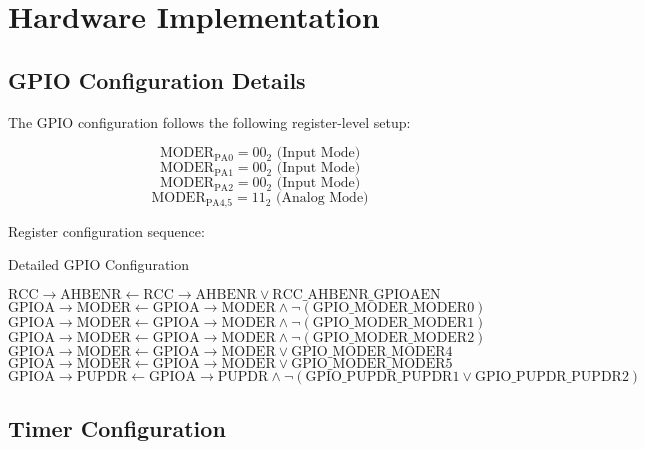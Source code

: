 \documentclass{article}
\begin{document}
\section{Hardware Implementation}
\subsection{GPIO Configuration Details}

The GPIO configuration follows the following register-level setup:

\begin{equation}
\text{MODER}_{\text{PA0}} = 00_2 \text{ (Input Mode)}
\end{equation}
\begin{equation}
\text{MODER}_{\text{PA1}} = 00_2 \text{ (Input Mode)}
\end{equation}
\begin{equation}
\text{MODER}_{\text{PA2}} = 00_2 \text{ (Input Mode)}
\end{equation}
\begin{equation}
\text{MODER}_{\text{PA4,5}} = 11_2 \text{ (Analog Mode)}
\end{equation}

Register configuration sequence:

\begin{algorithm}[H]
\caption{Detailed GPIO Configuration}
\begin{algorithmic}[1]
\State $\text{RCC}\rightarrow\text{AHBENR} \gets \text{RCC}\rightarrow\text{AHBENR} \lor \text{RCC\_AHBENR\_GPIOAEN}$
\State $\text{GPIOA}\rightarrow\text{MODER} \gets \text{GPIOA}\rightarrow\text{MODER} \land \neg(\text{GPIO\_MODER\_MODER0})$
\State $\text{GPIOA}\rightarrow\text{MODER} \gets \text{GPIOA}\rightarrow\text{MODER} \land \neg(\text{GPIO\_MODER\_MODER1})$
\State $\text{GPIOA}\rightarrow\text{MODER} \gets \text{GPIOA}\rightarrow\text{MODER} \land \neg(\text{GPIO\_MODER\_MODER2})$
\State $\text{GPIOA}\rightarrow\text{MODER} \gets \text{GPIOA}\rightarrow\text{MODER} \lor \text{GPIO\_MODER\_MODER4}$
\State $\text{GPIOA}\rightarrow\text{MODER} \gets \text{GPIOA}\rightarrow\text{MODER} \lor \text{GPIO\_MODER\_MODER5}$
\State $\text{GPIOA}\rightarrow\text{PUPDR} \gets \text{GPIOA}\rightarrow\text{PUPDR} \land \neg(\text{GPIO\_PUPDR\_PUPDR1} \lor \text{GPIO\_PUPDR\_PUPDR2})$
\end{algorithmic}
\end{algorithm}

\subsection{Timer Configuration}
\end{document}
